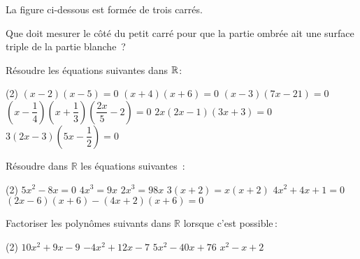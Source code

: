 \documentclass[a4paper,12pt]{report}
\begin{document}
\begin{exo}[2]
La figure ci-dessous est formée de trois carrés.

\hfill
\begin{minipage}{0.4\textwidth}{
\vspace{0pt}
Que doit mesurer le côté du petit carré pour que la partie ombrée ait une surface triple de la partie blanche~?
}
\end{minipage}
\hfill
\begin{minipage}{0.4\textwidth}{
\vspace{0pt}

}
\end{minipage}
\hfill
\end{exo}
\begin{exo}[1]
Résoudre les équations suivantes dans $\mathbb R$:
\begin{tasks}(2)
\task $(x-2)(x-5)=0$
\task $(x+4)(x+6)=0$
\task $(x-3)(7 x-21)=0$
\task $\left(x-\dfrac{1}{4}\right)\left(x+\dfrac{1}{3}\right)\left(\dfrac{2 x}{5}-2\right)=0$
\task $2 x(2 x-1)(3 x+3)=0$
\task $3(2 x-3)\left(5 x-\dfrac{1}{2}\right)=0$
\end{tasks}
\end{exo}
\begin{exo}
Résoudre dans $\mathbb{R}$ les équations suivantes~:
\begin{tasks}(2)
\task $5 x^2-8 x=0$
\task $4 x^3=9 x$
\task $2 x^3=98 x$
\task $3(x+2)=x(x+2)$
\task $4 x^2+4 x+1=0$
\task $(2 x-6)(x+6)-(4 x+2)(x+6)=0$
\end{tasks}
\end{exo}

\begin{exo}
Factoriser les polynômes suivants dans $\mathbb{R}$ lorsque c'est possible\,:
\begin{tasks}(2)
\task $10 x^2+9 x-9$
\task $-4 x^2+12 x-7$
\task $5 x^2-40 x+76$
\task $x^2-x+2$
\end{tasks}
\end{exo}
\end{document}

